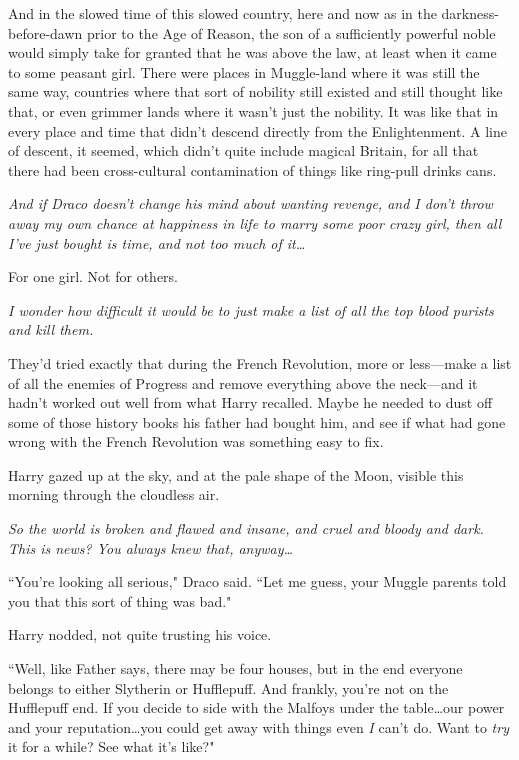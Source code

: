 And in the slowed time of this slowed country, here and now as in the darkness-before-dawn prior to the Age of Reason, the son of a sufficiently powerful noble would simply take for granted that he was above the law, at least when it came to some peasant girl. There were places in Muggle-land where it was still the same way, countries where that sort of nobility still existed and still thought like that, or even grimmer lands where it wasn't just the nobility. It was like that in every place and time that didn't descend directly from the Enlightenment. A line of descent, it seemed, which didn't quite include magical Britain, for all that there had been cross-cultural contamination of things like ring-pull drinks cans.

\emph{And if Draco doesn't change his mind about wanting revenge, and I don't throw away my own chance at happiness in life to marry some poor crazy girl, then all I've just bought is time, and not too much of it…}

For one girl. Not for others.

\emph{I wonder how difficult it would be to just make a list of all the top blood purists and kill them.}

They'd tried exactly that during the French Revolution, more or less—make a list of all the enemies of Progress and remove everything above the neck—and it hadn't worked out well from what Harry recalled. Maybe he needed to dust off some of those history books his father had bought him, and see if what had gone wrong with the French Revolution was something easy to fix.

Harry gazed up at the sky, and at the pale shape of the Moon, visible this morning through the cloudless air.

\emph{So the world is broken and flawed and insane, and cruel and bloody and dark. This is news? You always knew that, anyway…}

``You're looking all serious," Draco said. ``Let me guess, your Muggle parents told you that this sort of thing was bad."

Harry nodded, not quite trusting his voice.

``Well, like Father says, there may be four houses, but in the end everyone belongs to either Slytherin or Hufflepuff. And frankly, you're not on the Hufflepuff end. If you decide to side with the Malfoys under the table…our power and your reputation…you could get away with things even \emph{I} can't do. Want to \emph{try} it for a while? See what it's like?"

